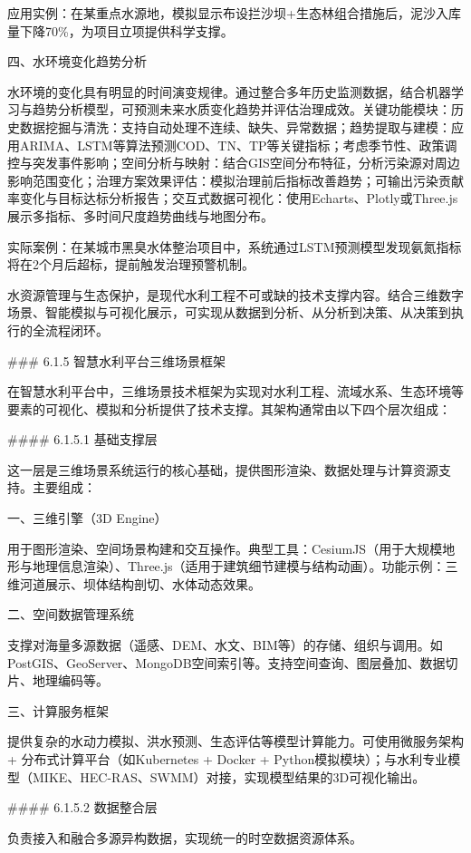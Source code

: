 应用实例：在某重点水源地，模拟显示布设拦沙坝+生态林组合措施后，泥沙入库量下降70\%，为项目立项提供科学支撑。

四、水环境变化趋势分析

水环境的变化具有明显的时间演变规律。通过整合多年历史监测数据，结合机器学习与趋势分析模型，可预测未来水质变化趋势并评估治理成效。关键功能模块：历史数据挖掘与清洗：支持自动处理不连续、缺失、异常数据；趋势提取与建模：应用ARIMA、LSTM等算法预测COD、TN、TP等关键指标；考虑季节性、政策调控与突发事件影响；空间分析与映射：结合GIS空间分布特征，分析污染源对周边影响范围变化；治理方案效果评估：模拟治理前后指标改善趋势；可输出污染贡献率变化与目标达标分析报告；交互式数据可视化：使用Echarts、Plotly或Three.js展示多指标、多时间尺度趋势曲线与地图分布。

实际案例：在某城市黑臭水体整治项目中，系统通过LSTM预测模型发现氨氮指标将在2个月后超标，提前触发治理预警机制。

水资源管理与生态保护，是现代水利工程不可或缺的技术支撑内容。结合三维数字场景、智能模拟与可视化展示，可实现从数据到分析、从分析到决策、从决策到执行的全流程闭环。

\#\#\# 6.1.5 智慧水利平台三维场景框架

在智慧水利平台中，三维场景技术框架为实现对水利工程、流域水系、生态环境等要素的可视化、模拟和分析提供了技术支撑。其架构通常由以下四个层次组成：

\#\#\#\# 6.1.5.1 基础支撑层

这一层是三维场景系统运行的核心基础，提供图形渲染、数据处理与计算资源支持。主要组成：

一、三维引擎（3D Engine）

用于图形渲染、空间场景构建和交互操作。典型工具：CesiumJS（用于大规模地形与地理信息渲染）、Three.js（适用于建筑细节建模与结构动画）。功能示例：三维河道展示、坝体结构剖切、水体动态效果。

二、空间数据管理系统

支撑对海量多源数据（遥感、DEM、水文、BIM等）的存储、组织与调用。如PostGIS、GeoServer、MongoDB空间索引等。支持空间查询、图层叠加、数据切片、地理编码等。

三、计算服务框架

提供复杂的水动力模拟、洪水预测、生态评估等模型计算能力。可使用微服务架构 + 分布式计算平台（如Kubernetes + Docker + Python模拟模块）；与水利专业模型（MIKE、HEC-RAS、SWMM）对接，实现模型结果的3D可视化输出。

\#\#\#\# 6.1.5.2 数据整合层

负责接入和融合多源异构数据，实现统一的时空数据资源体系。

